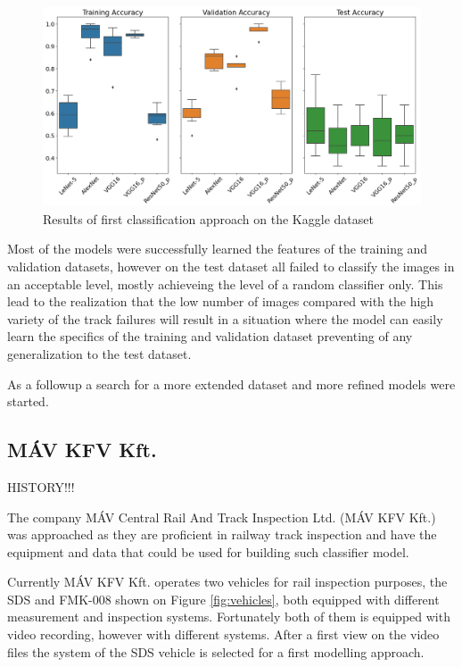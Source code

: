 \begin{figure}[!ht]
    \centering
    \includegraphics[width=\textwidth]{./tex_images/bootstrap_results.png}
    \caption{Results of first classification approach on the Kaggle dataset}
    \label{fig:Kaggle_results}
\end{figure}

Most of the models were successfully learned the features of the training and validation datasets,
however on the test dataset all failed to classify the images in an acceptable level, mostly
achieveing the level of a random classifier only.
This lead to the realization that the low number of images compared with the high variety of the track
failures will result in a situation where the model can easily learn the specifics of the training and
validation dataset preventing of any generalization to the test dataset.

As a followup a search for a more extended dataset and more refined models were started.

\subsection{MÁV KFV Kft.}

HISTORY!!!


The company MÁV Central Rail And Track Inspection Ltd. (MÁV KFV Kft.) \cite{_mav_} was approached
as they are proficient in railway track inspection and have the equipment and data that could be used
for building such classifier model.

Currently MÁV KFV Kft. operates two vehicles for rail inspection purposes, the SDS and FMK-008 shown on
Figure \ref{fig:vehicles}, both equipped with different measurement and inspection systems.
Fortunately both of them is equipped with video recording, however with different systems.
After a first view on the video files the system of the SDS vehicle is selected for a first modelling
approach.

